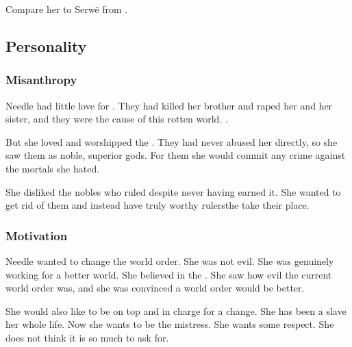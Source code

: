 Compare her to Serw\"e from . 










\subsection{Personality}





\subsubsection{Misanthropy}
Needle had little love for \humans{}. 
They had killed her brother and raped her and her sister, and they were the cause of this rotten world. 
\Scathae{} . 

But she loved and worshipped the \resphain. 
They had never abused her directly, so she saw them as noble, superior gods. 
For them she would commit any crime against the mortals she hated. 

She disliked the nobles who ruled \Miith{} despite never having earned it. 
She wanted to get rid of them and instead have truly worthy rulers\dash the \resphain{}\dash take their place. 





\subsubsection{Motivation}
Needle wanted to change the world order. 
She was not evil. 
She was genuinely working for a better world. 
She believed in the \resphain.
She saw how evil the current world order was, and she was convinced a \resphan world order would be better. 

She would also like to be on top and in charge for a change. 
She has been a slave her whole life. 
Now she wants to be the mistress. 
She wants some respect. 
She does not think it is so much to ask for. 

